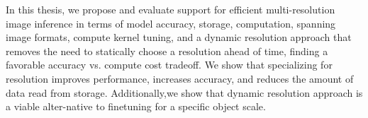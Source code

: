In this thesis, we propose and evaluate support for efficient multi-resolution image inference in terms of model accuracy, storage, computation, spanning image formats, compute kernel tuning, and a dynamic resolution approach that removes the need to statically choose a resolution ahead of time, finding a favorable accuracy vs. compute cost tradeoff.
We show that specializing for resolution improves performance, increases accuracy, and reduces the amount of data read from storage. Additionally,we show that dynamic resolution approach is a viable alter-native to finetuning for a specific object scale.
